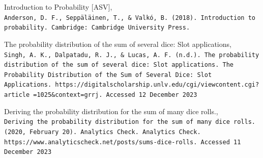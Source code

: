 \documentclass[a4paper]{article}
\begin{document}
\begin{thebibliography}{3}

Introduction to Probability [ASV],
\\\texttt{Anderson, D. F., Seppäläinen, T., \& Valkó, B. (2018). Introduction to probability. Cambridge: Cambridge University Press.}


The probability distribution of the sum of several dice: Slot applications,
\\\texttt{Singh, A. K., Dalpatadu, R. J., \& Lucas, A. F. (n.d.). The probability distribution of the sum of several dice: Slot applications. The Probability Distribution of the Sum of Several Dice: Slot Applications. https://digitalscholarship.unlv.edu/cgi/viewcontent.cgi?article =1025\&context=grrj. Accessed 12 December 2023}

Deriving the probability distribution for the sum of many dice rolls.,
\\\texttt{Deriving the probability distribution for the sum of many dice rolls. (2020, February 20). Analytics Check. Analytics Check. https://www.analyticscheck.net/posts/sums-dice-rolls. Accessed 11 December 2023}

\end{thebibliography}
\end{document}
